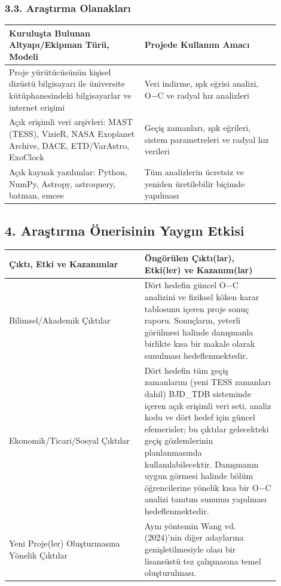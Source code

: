 \subsubsection*{3.3. Araştırma Olanakları}
{\footnotesize\begin{longtable}{|p{0.450\linewidth}|p{0.450\linewidth}|}\hline
\textbf{Kuruluşta Bulunan Altyapı/Ekipman Türü, Modeli} & \textbf{Projede Kullanım Amacı}\\\hline\endhead
Proje yürütücüsünün kişisel dizüstü bilgisayarı ile üniversite kütüphanesindeki bilgisayarlar ve internet erişimi & Veri indirme, ışık eğrisi analizi, O−C ve radyal hız analizleri\\\hline
Açık erişimli veri arşivleri: MAST (TESS), VizieR, NASA Exoplanet Archive, DACE, ETD/VarAstro, ExoClock & Geçiş zamanları, ışık eğrileri, sistem parametreleri ve radyal hız verileri\\\hline
Açık kaynak yazılımlar: Python, NumPy, Astropy, astroquery, batman, emcee & Tüm analizlerin ücretsiz ve yeniden üretilebilir biçimde yapılması\\\hline
\end{longtable}}
\subsection*{4. Araştırma Önerisinin Yaygın Etkisi}
{\footnotesize\begin{longtable}{|p{0.450\linewidth}|p{0.450\linewidth}|}\hline
\textbf{Çıktı, Etki ve Kazanımlar} & \textbf{Öngörülen Çıktı(lar), Etki(ler) ve Kazanım(lar)}\\\hline\endhead
Bilimsel/Akademik Çıktılar & Dört hedefin güncel O−C analizini ve fiziksel köken karar tablosunu içeren proje sonuç raporu. Sonuçların, yeterli görülmesi halinde danışmanla birlikte kısa bir makale olarak sunulması hedeflenmektedir.\\\hline
Ekonomik/Ticari/Sosyal Çıktılar & Dört hedefin tüm geçiş zamanlarını (yeni TESS zamanları dahil) BJD\_TDB sisteminde içeren açık erişimli veri seti, analiz kodu ve dört hedef için güncel efemerisler; bu çıktılar gelecekteki geçiş gözlemlerinin planlanmasında kullanılabilecektir. Danışmanın uygun görmesi halinde bölüm öğrencilerine yönelik kısa bir O−C analizi tanıtım sunumu yapılması hedeflenmektedir.\\\hline
Yeni Proje(ler) Oluşturmasına Yönelik Çıktılar & Aynı yöntemin Wang vd. (2024)'nin diğer adaylarına genişletilmesiyle olası bir lisansüstü tez çalışmasına temel oluşturulması.\\\hline
\end{longtable}}

